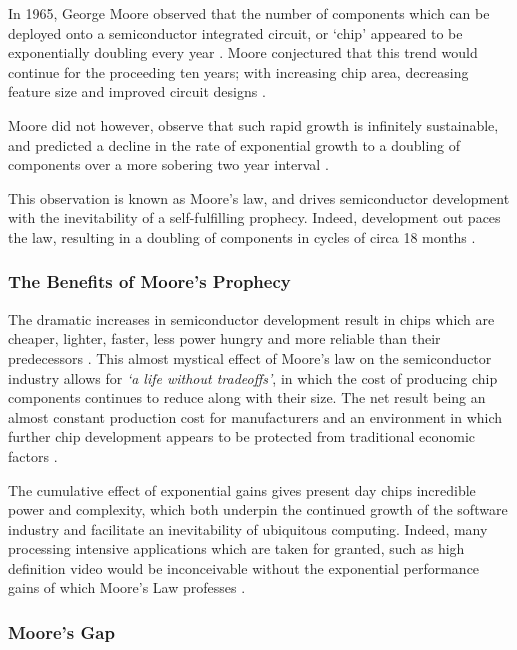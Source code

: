 \documentclass[12pt,a4paper]{article}
\begin{document}
In 1965, George Moore observed that the number of components which can be deployed onto a semiconductor integrated circuit, or `chip' appeared to be exponentially doubling every year \cite{fiftyYearsOfMoores}. Moore conjectured that this trend would continue for the proceeding ten years; with increasing chip area, decreasing feature size and improved circuit designs \cite{endOfSemiconductors}.

Moore did not however, observe that such rapid growth is infinitely sustainable, and predicted a decline in the rate of exponential growth to a doubling of components over a more sobering two year interval \cite{fiftyYearsOfMoores}.

This observation is known as Moore's law, and drives semiconductor development with the inevitability of a self-fulfilling prophecy. Indeed, development out paces the law, resulting in a doubling of components in cycles of circa 18 months \cite{fiftyYearsOfMoores}.

\subsubsection{The Benefits of Moore's Prophecy} 

The dramatic increases in semiconductor development result in chips which are cheaper, lighter, faster, less power hungry and more reliable than their predecessors \cite{fiftyYearsOfMoores}. This almost mystical effect of Moore's law on the semiconductor industry allows for \cite{fiftyYearsOfMoores}  \textit{`a life without tradeoffs'}, in which the cost of producing chip components continues to reduce along with their size. The net result being an almost constant production cost for manufacturers and an environment in which further chip development appears to be protected from traditional economic factors \cite{fiftyYearsOfMoores}.

The cumulative effect of exponential gains gives present day chips incredible power and complexity, which both underpin the continued growth of the software industry and facilitate an inevitability of ubiquitous computing. Indeed, many processing intensive applications which are taken for granted, such as high definition video would be inconceivable without the exponential performance gains of which Moore's Law professes \cite{theKillRule}.

\subsubsection{Moore's Gap}
\end{document}
